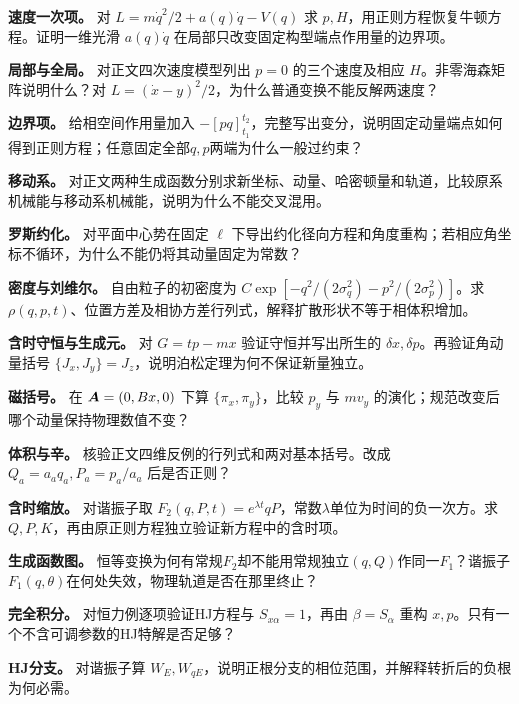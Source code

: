 \begin{bookexercises}
\item {} \textbf{速度一次项。} 对 $L=m\dot q^2/2+a(q)\dot q-V(q)$ 求 $p,H$，用正则方程恢复牛顿方程。证明一维光滑 $a(q)\dot q$ 在局部只改变固定构型端点作用量的边界项。
\item {} \textbf{局部与全局。} 对正文四次速度模型列出 $p=0$ 的三个速度及相应 $H$。非零海森矩阵说明什么？对 $L=(\dot x-y)^2/2$，为什么普通变换不能反解两速度？
\item {} \textbf{边界项。} 给相空间作用量加入 $-[pq]_{t_1}^{t_2}$，完整写出变分，说明固定动量端点如何得到正则方程；任意固定全部$q,p$两端为什么一般过约束？
\item {} \textbf{移动系。} 对正文两种生成函数分别求新坐标、动量、哈密顿量和轨道，比较原系机械能与移动系机械能，说明为什么不能交叉混用。
\item {} \textbf{罗斯约化。} 对平面中心势在固定 $\ell$ 下导出约化径向方程和角度重构；若相应角坐标不循环，为什么不能仍将其动量固定为常数？
\item {} \textbf{密度与刘维尔。} 自由粒子的初密度为 $C\exp[-q^2/(2\sigma_q^2)-p^2/(2\sigma_p^2)]$。求 $\rho(q,p,t)$、位置方差及相协方差行列式，解释扩散形状不等于相体积增加。
\item {} \textbf{含时守恒与生成元。} 对 $G=tp-mx$ 验证守恒并写出所生的 $\delta x,\delta p$。再验证角动量括号 $\{J_x,J_y\}=J_z$，说明泊松定理为何不保证新量独立。
\item {} \textbf{磁括号。} 在 $\boldsymbol{A}=(0,Bx,0)$ 下算 $\{\pi_x,\pi_y\}$，比较 $p_y$ 与 $mv_y$ 的演化；规范改变后哪个动量保持物理数值不变？
\item {} \textbf{体积与辛。} 核验正文四维反例的行列式和两对基本括号。改成 $Q_a=a_aq_a,P_a=p_a/a_a$ 后是否正则？
\item {} \textbf{含时缩放。} 对谐振子取 $F_2(q,P,t)=e^{\lambda t}qP$，常数$\lambda$单位为时间的负一次方。求 $Q,P,K$，再由原正则方程独立验证新方程中的含时项。
\item {} \textbf{生成函数图。} 恒等变换为何有常规$F_2$却不能用常规独立$(q,Q)$作同一$F_1$？谐振子$F_1(q,\theta)$在何处失效，物理轨道是否在那里终止？
\item {} \textbf{完全积分。} 对恒力例逐项验证HJ方程与 $S_{x\alpha}=1$，再由 $\beta=S_\alpha$ 重构 $x,p$。只有一个不含可调参数的HJ特解是否足够？
\item {} \textbf{HJ分支。} 对谐振子算 $W_E,W_{qE}$，说明正根分支的相位范围，并解释转折后的负根为何必需。

\end{bookexercises}
